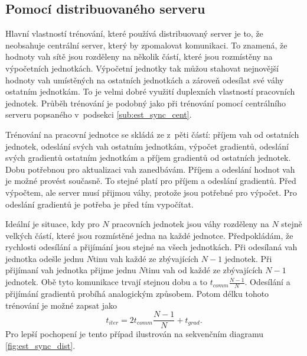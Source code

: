 \subsection{Pomocí distribuovaného serveru}
\label{sub:est_sync_dist}

Hlavní vlastností trénování, které používá distribuovaný server je to, že neobsahuje centrální server, který by zpomalovat komunikaci.
To znamená, že hodnoty vah sítě jsou rozděleny na několik částí, které jsou rozmístěny na výpočetních jednotkách.
Výpočetní jednotky tak můžou stahovat nejnovější hodnoty vah umístěných na ostatních jednotkách a zároveň odesílat své váhy ostatním jednotkám.
To je velmi dobré využití duplexních vlastností pracovních jednotek.
Průběh trénování je podobný jako při trénování pomocí centrálního serveru popsaného v~podsekci \ref{sub:est_sync_cent}.

Trénování na pracovní jednotce se skládá ze z~pěti částí: příjem vah od ostatních jednotek, odeslání svých vah ostatním jednotkám, výpočet gradientů, odeslání svých gradientů ostatním jednotkám a příjem gradientů od ostatních jednotek.
Dobu potřebnou pro aktualizaci vah zanedbávám.
Příjem a odeslání hodnot vah je možné provést současně.
To stejné platí pro příjem a odeslání gradientů.
Před výpočtem, ale server musí přijmou váhy, protože jsou potřebné pro výpočet.
Pro odeslání gradientů je potřeba je před tím vypočítat.

Ideální je situace, kdy pro $N$ pracovních jednotek jsou váhy rozděleny na $N$ stejně velkých částí, které jsou rozmístěné jedna na každé jednotce.
Předpokládám, že rychlosti odesílání a přijímání jsou stejné na všech jednotkách.
Při odesílaná vah jednotka odešle jednu $N$tinu vah každé ze zbývajících $N-1$ jednotek.
Při přijímaní vah jednotka přijme jednu $N$tinu vah od každé ze zbývajících $N-1$ jednotek.
Obě tyto komunikace trvají stejnou dobu a to $t_{comm}\frac{N-1}{N}$.
Odesílání a přijímání gradientů probíhá analogickým způsobem.
Potom délku tohoto trénování je možné zapsat jako \begin{equation}t_{iter}=2t_{comm}\frac{N-1}{N}+t_{grad}.\label{eq:est_sync_dist}\end{equation}
Pro lepší pochopení je tento případ ilustrován na sekvenčním diagramu \ref{fig:est_sync_dist}.

